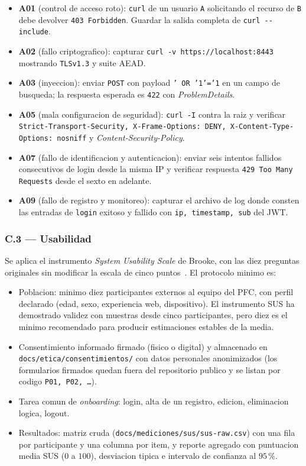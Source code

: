 \documentclass[11pt,a4paper]{article}
\begin{document}
\begin{itemize}
    \item \textbf{A01} (control de acceso roto): \texttt{curl} de un usuario \texttt{A} solicitando el recurso de \texttt{B} debe devolver \texttt{403 Forbidden}. Guardar la salida completa de \texttt{curl -{-}include}.
    \item \textbf{A02} (fallo criptografico): capturar \texttt{curl -v https://localhost:8443} mostrando \texttt{TLSv1.3} y suite AEAD.
    \item \textbf{A03} (inyeccion): enviar \texttt{POST} con payload \texttt{' OR '1'='1} en un campo de busqueda; la respuesta esperada es \texttt{422} con \emph{ProblemDetails}.
    \item \textbf{A05} (mala configuracion de seguridad): \texttt{curl -I} contra la raiz y verificar \texttt{Strict-Transport-Security, X-Frame-Options: DENY, X-Content-Type-Options: nosniff} y \emph{Content-Security-Policy}.
    \item \textbf{A07} (fallo de identificacion y autenticacion): enviar seis intentos fallidos consecutivos de login desde la misma IP y verificar respuesta \texttt{429 Too Many Requests} desde el sexto en adelante.
    \item \textbf{A09} (fallo de registro y monitoreo): capturar el archivo de log donde consten las entradas de \texttt{login} exitoso y fallido con \texttt{ip, timestamp, sub} del JWT.
\end{itemize}

\subsubsection*{C.3 --- Usabilidad}

Se aplica el instrumento \emph{System Usability Scale} de Brooke, con las diez preguntas originales sin modificar la escala de cinco puntos~\cite{brooke1996sus}. El protocolo minimo es:

\begin{itemize}
    \item Poblacion: minimo diez participantes externos al equipo del PFC, con perfil declarado (edad, sexo, experiencia web, dispositivo). El instrumento SUS ha demostrado validez con muestras desde cinco participantes, pero diez es el minimo recomendado para producir estimaciones estables de la media.
    \item Consentimiento informado firmado (fisico o digital) y almacenado en \texttt{docs/etica/consentimientos/} con datos personales anonimizados (los formularios firmados quedan fuera del repositorio publico y se listan por codigo \texttt{P01, P02, \ldots}).
    \item Tarea comun de \emph{onboarding}: login, alta de un registro, edicion, eliminacion logica, logout.
    \item Resultados: matriz cruda (\texttt{docs/mediciones/sus/sus-raw.csv}) con una fila por participante y una columna por item, y reporte agregado con puntuacion media SUS ($0$ a $100$), desviacion tipica e intervalo de confianza al $95$\,\%.
\end{itemize}
\end{document}
